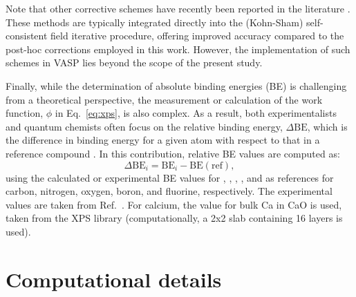 \documentclass[journal=jpccck,manuscript=article]{achemso}
\begin{document}
Note that other corrective schemes have recently been reported in the literature \cite{freysoldtFirstprinciplesCalculationsCharged2018,freysoldtGeneralizedDipoleCorrection2020,chagasdasilvaSelfConsistentPotentialCorrection2021,rutterChargedSurfacesSlabs2021}. These methods are typically integrated directly into the (Kohn-Sham) self-consistent field iterative procedure, offering improved accuracy compared to the post-hoc corrections employed in this work. However, the implementation of such schemes in VASP lies beyond the scope of the present study.

Finally, while the determination of absolute binding energies (BE) is challenging from a theoretical perspective, the measurement or calculation of the work function, $\phi$ in Eq.~\eqref{eq:xps}, is also complex. As a result, both experimentalists and quantum chemists often focus on the relative binding energy, $\Delta\text{BE}$, which is the difference in binding energy for a given atom with respect  to that in a reference compound \cite{vinesPredictionCoreLevel2018,stevieIntroductionXrayPhotoelectron2020,greczynskiXrayPhotoelectronSpectroscopy2020}. In this contribution, relative BE values are computed as:\begin{equation}
	\Delta\text{BE}_i = \text{BE}_i - \text{BE}(\text{ref}), \label{eq:dbe}
\end{equation} 
using the calculated or experimental BE values for , , , , and  as references for carbon, nitrogen, oxygen, boron, and fluorine, respectively. The experimental values are taken from Ref.~. For calcium, the value for bulk Ca in CaO is used, taken from the XPS library \cite{cristXPSLibraryWebsite2021a} (computationally, a  2x2 slab containing 16 layers is used).

	
\section{Computational details}\label{sec:comp}
\end{document}
